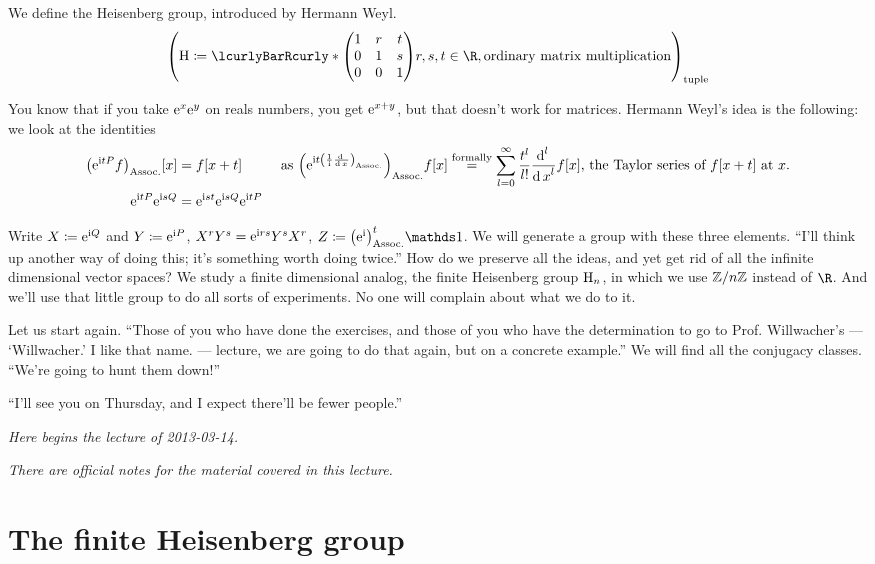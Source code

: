 \documentclass[10pt]{article}
\newcommand{\lectureStart}[1]{

\begin{flushright}
\emph{Here begins the lecture of #1.}
\end{flushright}

}
\newcommand{\lectureEnd}[1]{

}
\newcommand{\officialNotes}{

\begin{flushleft}
\emph{There are official notes for the material covered in this lecture.}
\end{flushleft}

}
\begin{document}
\begin{definition}
We define the Heisenberg group, introduced by Hermann Weyl.
\begin{equation*}
\tuple{
\HeisenbergGroup \DefineAs \setst{
\begin{pmatrix}
1 & r & t\\
0 & 1 & s\\
0 & 0 & 1\\
\end{pmatrix}
}{r,s,t\in\R}, 
\text{ordinary matrix multiplication}}
\end{equation*}
\end{definition}

You know that if you take $\mathrm{e}^x\mathrm{e}^y$ on reals numbers, you get $\mathrm{e}^{x+y}$, but that doesn't work for matrices. Hermann Weyl's idea is the following: we look at the identities \begin{align*}
\pa{\E^{\I t P} f}\of x &= f\of{x+t}
&&\text{ as }\pa{\E^{\I t \pa{\frac{1}{\I}\derivop x}}}f\of x \overset{\text{formally}}{=} \sum{l=0}[\infty]\frac{t^l}{l!}\derivop[l] x f \of x \text{, the Taylor series of $f\of{x + t}$ at $x$.}\\
\E^{\I t P}\E^{\I s Q} &= \E^{\I s t} \E^{\I s Q} \E^{\I t P}
\end{align*}

Write $X \coloneqq \mathrm{e}^{\mathrm{i} Q}$ and $Y \coloneqq \mathrm{e}^{\mathrm{i} P}$, $X^r Y^s = \mathrm{e}^{\mathrm{i} r s} Y^s X^r$, $Z \DefineAs \pa{\E^\I}^t \Identity$. We will generate a group with these three elements. ``I'll think up another way of doing this; it's something worth doing twice.'' How do we preserve all the ideas, and yet get rid of all the infinite dimensional vector spaces? We study a finite dimensional analog, the finite Heisenberg group $\mathrm{H}_{n}$, in which we use $\mathbb{Z} /{n}\mathbb{Z}$ instead of $\R$. And we'll use that little group to do all sorts of experiments. No one will complain about what we do to it. 

Let us start again. ``Those of you who have done the exercises, and those of you who have the determination to go to Prof. Willwacher's --- `Willwacher.' I like that name. --- lecture, we are going to do that again, but on a concrete example.''
We will find all the conjugacy classes. ``We're going to hunt them down!'' 

``I'll see you on Thursday, and I expect there'll be fewer people.''
\lectureEnd{2013-03-12}
\lectureStart{2013-03-14}
\officialNotes

\section{The finite Heisenberg group}
\end{document}
